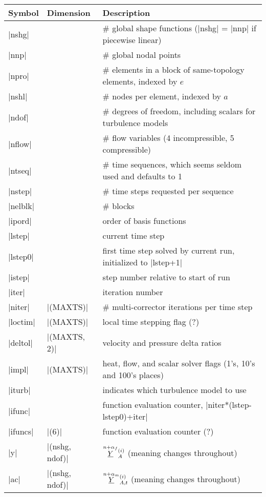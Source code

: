 \documentclass[11pt]{article}
\begin{document}
\begin{center}
\begin{tabular}{@{}lll@{}}
\toprule
Symbol & Dimension & Description \\
\midrule
|nshg|   &  & \# global shape functions (|nshg| = |nnp| if piecewise linear) \\
|nnp|    &  & \# global nodal points \\
|npro|   &  & \# elements in a block of same-topology elements, indexed by $e$ \\
|nshl|   &  & \# nodes per element, indexed by $a$ \\
|ndof|   &  & \# degrees of freedom, including scalars for turbulence models \\
|nflow|  &  & \# flow variables (4 incompressible, 5 compressible) \\
|ntseq|  &  & \# time sequences, which seems seldom used and defaults to 1 \\
|nstep|  &  & \# time steps requested per sequence \\
|nelblk| &  & \# blocks \\
|ipord|  &  & order of basis functions \\
|lstep|  &  & current time step \\
|lstep0| &  & first time step solved by current run, initialized to |lstep+1| \\
|istep|  &  & step number relative to start of run \\
|iter|   &  & iteration number \\
|niter|  & |(MAXTS)|    & \# multi-corrector iterations per time step \\
|loctim| & |(MAXTS)|    & local time stepping flag (?) \\
|deltol| & |(MAXTS, 2)| & velocity and pressure delta ratios \\
|impl|   & |(MAXTS)|    & heat, flow, and scalar solver flags (1's, 10's and 100's places) \\
|iturb|  &  & indicates which turbulence model to use \\
|ifunc|  &  & function evaluation counter, |niter*(lstep-lstep0)+iter| \\
|ifuncs| & |(6)|						& function evaluation counter (?) \\
|y|      & |(nshg, ndof)|            & $\oset{n+\alpha_f}{\ul{Y}}_{A}^{(i)}$ (meaning changes throughout) \\
|ac|     & |(nshg, ndof)|            & $\oset{n+\alpha_m}{\ul{Y}}_{A,t}^{(i)}$ (meaning changes throughout) \\

\end{tabular}
\end{center}
\end{document}
